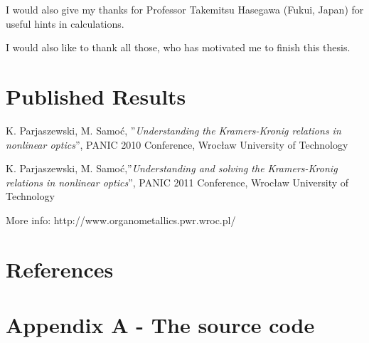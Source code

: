 \documentclass[12pt,twoside,a4paper]{article}
\numberwithin{equation}{subsection}
\numberwithin{figure}{subsection}
\begin{document}
I would also give my thanks for Professor Takemitsu Hasegawa (Fukui, Japan) for useful hints in calculations.

I would also like to thank all those, who has motivated me to finish this thesis.

\section{Published Results} \label{chap:published_results}


K. Parjaszewski, M. Samoć, ''\textit{Understanding the Kramers-Kronig relations in nonlinear optics}'', PANIC 2010 Conference,
Wrocław University of Technology


K. Parjaszewski, M. Samoć,''\textit{Understanding and solving the Kramers-Kronig relations in nonlinear optics}'', PANIC 2011
Conference, Wrocław University of Technology


More info: http://www.organometallics.pwr.wroc.pl/


\section{References}
\nocite{*}




\section*{Appendix A - The source code}
\end{document}
